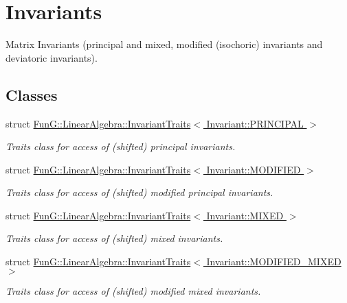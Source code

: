 \hypertarget{group__InvariantGroup}{\section{Invariants}
\label{group__InvariantGroup}
}


Matrix Invariants (principal and mixed, modified (isochoric) invariants and deviatoric invariants).  


\subsection*{Classes}
\begin{DoxyCompactItemize}
\item 
struct \hyperlink{structFunG_1_1LinearAlgebra_1_1InvariantTraits_3_01Invariant_1_1PRINCIPAL_01_4}{Fun\-G\-::\-Linear\-Algebra\-::\-Invariant\-Traits$<$ Invariant\-::\-P\-R\-I\-N\-C\-I\-P\-A\-L $>$}
\begin{DoxyCompactList}\small\item\em Traits class for access of (shifted) principal invariants. \end{DoxyCompactList}\item 
struct \hyperlink{structFunG_1_1LinearAlgebra_1_1InvariantTraits_3_01Invariant_1_1MODIFIED_01_4}{Fun\-G\-::\-Linear\-Algebra\-::\-Invariant\-Traits$<$ Invariant\-::\-M\-O\-D\-I\-F\-I\-E\-D $>$}
\begin{DoxyCompactList}\small\item\em Traits class for access of (shifted) modified principal invariants. \end{DoxyCompactList}\item 
struct \hyperlink{structFunG_1_1LinearAlgebra_1_1InvariantTraits_3_01Invariant_1_1MIXED_01_4}{Fun\-G\-::\-Linear\-Algebra\-::\-Invariant\-Traits$<$ Invariant\-::\-M\-I\-X\-E\-D $>$}
\begin{DoxyCompactList}\small\item\em Traits class for access of (shifted) mixed invariants. \end{DoxyCompactList}\item 
struct \hyperlink{structFunG_1_1LinearAlgebra_1_1InvariantTraits_3_01Invariant_1_1MODIFIED__MIXED_01_4}{Fun\-G\-::\-Linear\-Algebra\-::\-Invariant\-Traits$<$ Invariant\-::\-M\-O\-D\-I\-F\-I\-E\-D\-\_\-\-M\-I\-X\-E\-D $>$}
\begin{DoxyCompactList}\small\item\em Traits class for access of (shifted) modified mixed invariants. \end{DoxyCompactList}\item 

\end{DoxyCompactItemize}
